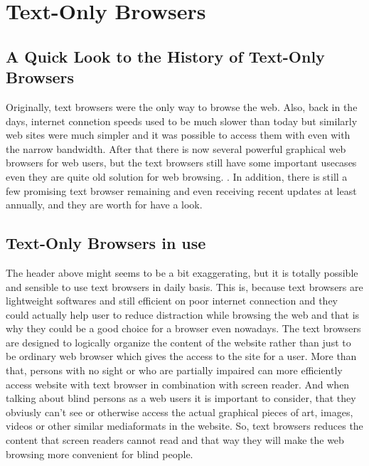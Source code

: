 %
%
% 
% 


\chapter{Text-Only Browsers}

\section[tb-history]{A Quick Look to the History of Text-Only Browsers}
Originally, text browsers were the only way to browse the web. Also, back in the days, internet connetion speeds used to be much slower than today but similarly web sites were much simpler and it was possible to access them with even with the narrow bandwidth. After that there is now several powerful graphical web browsers for web users, but the text browsers still have some important usecases even they are quite old solution for web browsing. \parencite{best-text-browsers}. In addition, there is still a few promising text browser remaining and even receiving recent updates at least annually, and they are worth for have a look.

\section[tb-known]{Text-Only Browsers in use}
The header above might seems to be a bit exaggerating, but it is totally possible and sensible to use text browsers in daily basis. This is, because text browsers are lightweight softwares and still efficient on poor internet connection and they could actually help user to reduce distraction while browsing the web and that is why they could be a good choice for a browser even nowadays. The text browsers are designed to logically organize the content of the website rather than just to be ordinary web browser which gives the access to the site for a user. More than that, persons with no sight or who are partially impaired can more efficiently access website with text browser in combination with screen reader. And when talking about blind persons as a web users it is important to consider, that they obviusly can't see or otherwise access the actual graphical pieces of art, images, videos or other similar mediaformats in the website. \parencite[Chapter 2]{webbie} So, text browsers reduces the content that screen readers cannot read and that way they will make the web browsing more convenient for blind people.

